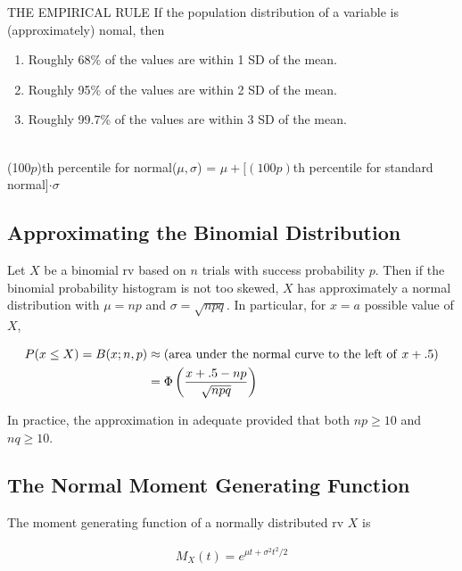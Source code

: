 \begin{proposition}{THE EMPIRICAL RULE}
    If the population distribution of a variable is (approximately) nomal, then

    \begin{enumerate}
        \item Roughly 68\% of the values are within 1 SD of the mean.
        \item Roughly 95\% of the values are within 2 SD of the mean.
        \item Roughly 99.7\% of the values are within 3 SD of the mean.
    \end{enumerate}
\end{proposition}

\begin{proposition}
    ~\\(100$p$)th percentile for normal($\mu,\sigma$) = $\mu + [(100p)$th percentile for standard normal]$\cdot\sigma$
\end{proposition}

\subsection{Approximating the Binomial Distribution}

\begin{proposition}
    Let $X$ be a binomial rv based on $n$ trials with success probability $p$. Then if the binomial probability histogram is not too skewed, $X$ has approximately a normal distribution with $\mu = np$ and $\sigma = \sqrt{npq}$. In particular, for $x=a$ possible value of $X$,

    \begin{align*}
        P(x\leq X) = B(x;n,p) & \approx ({\rm area\ under\ the\ normal\ curve\ to\ the\ left\ of\ }x + .5) \\
        & = \Phi\left(\frac{x+.5-np}{\sqrt{npq}}\right) \\
    \end{align*}

    In practice, the approximation in adequate provided that both $np\geq 10$ and $nq\geq 10$.
\end{proposition}

\subsection{The Normal Moment Generating Function}

\begin{proposition}
    The moment generating function of a normally distributed rv $X$ is 

    \begin{align*}
        M_X(t) = e^{\mu t + \sigma^2t^2/2} \\
    \end{align*}
\end{proposition}

